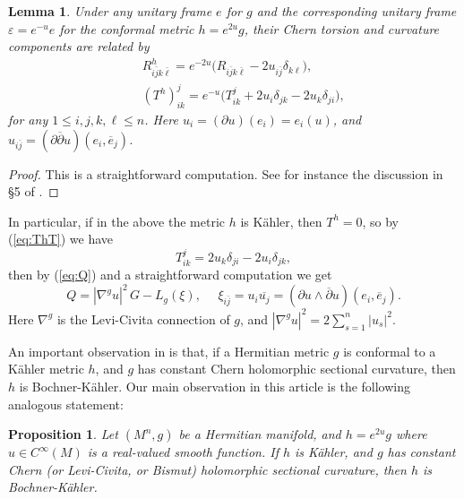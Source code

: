 \documentclass{amsart}
\newtheorem{lemma}{Lemma}
\newtheorem{proposition}{Proposition}
\numberwithin{equation}{section}
\begin{document}
\begin{lemma}
Under any unitary frame $e$ for $g$ and the corresponding unitary frame $\varepsilon=e^{-u}e$ for the conformal metric $h=e^{2u}g$, their Chern torsion and curvature components are related by
\begin{eqnarray}
&& R^h_{i\bar{j}k\bar{\ell}} = e^{-2u} \big( R_{i\bar{j}k\bar{\ell}} - 2u_{i\bar{j}}  \delta_{k\ell} \big),  \label{eq:RhR}\\
&& (T^h)^j_{ik} = e^{-u} \big( T^j_{ik} + 2u_i\delta_{jk} -2 u_k \delta_{ji} \big),  \label{eq:ThT}
\end{eqnarray}
for any $1\leq i,j,k, \ell \leq n$. Here $u_i= (\partial u)(e_i)=e_i(u)$, and $u_{i\bar{j}}= (\partial \overline{\partial } u)(e_i, \overline{e}_j)$.
\end{lemma}

\begin{proof}
This is a straightforward computation. See for instance the discussion in \S 5 of \cite{YangZ}.
\end{proof}

In particular, if in the above the metric $h$ is K\"ahler, then $T^h=0$, so by (\ref{eq:ThT}) we have
\begin{equation}  \label{eq:T2}
T^j_{ik} =  2 u_k \delta_{ji} -2u_i\delta_{jk},
\end{equation}
then by (\ref{eq:Q}) and a straightforward computation we get
\begin{equation}  \label{eq:Q2}
Q =  |\nabla^g u|^2 \,G - L_g(\xi), \ \ \ \ \ \ \xi_{i\bar{j}} = u_i \overline{u_j} =(\partial u\wedge \overline{\partial}u)(e_i,\overline{e}_j).
\end{equation}
Here $\nabla^g$ is the Levi-Civita connection of $g$, and $|\nabla^g u|^2=2\sum_{s=1}^n |u_s|^2$.


An important observation in \cite{HW} is that, if a Hermitian metric $g$ is  conformal to a  K\"ahler metric $h$, and $g$ has constant Chern holomorphic sectional curvature, then $h$ is Bochner-K\"ahler. Our main  observation in this article is the following analogous statement:

\begin{proposition}  \label{prop1}
Let $(M^n,g)$ be a Hermitian manifold, and $h=e^{2u}g$ where $u\in C^{\infty}(M)$ is a real-valued smooth function. If $h$ is K\"ahler, and $g$ has constant Chern (or Levi-Civita, or Bismut) holomorphic sectional curvature, then $h$ is Bochner-K\"ahler.
\end{proposition}
\end{document}
